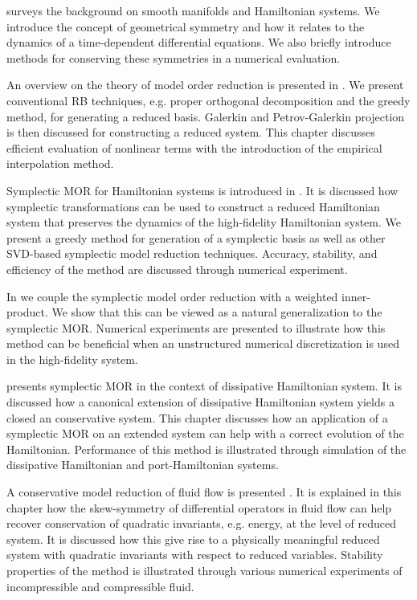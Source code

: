  surveys the background on smooth manifolds and Hamiltonian systems. We introduce the concept of geometrical symmetry and how it relates to the dynamics of a time-dependent differential equations. We also briefly introduce methods for conserving these symmetries in a numerical evaluation.

An overview on the theory of model order reduction is presented in . We present conventional RB techniques, e.g. proper orthogonal decomposition and the greedy method, for generating a reduced basis. Galerkin and Petrov-Galerkin projection is then discussed for constructing a reduced system. This chapter discusses efficient evaluation of nonlinear terms with the introduction of the empirical interpolation method.

Symplectic MOR for Hamiltonian systems is introduced in . It is discussed how symplectic transformations can be used to construct a reduced Hamiltonian system that preserves the dynamics of the high-fidelity Hamiltonian system. We present a greedy method for generation of a symplectic basis as well as other SVD-based symplectic model reduction techniques. Accuracy, stability, and efficiency of the method are discussed through numerical experiment.

In  we couple the symplectic model order reduction with a weighted inner-product. We show that this can be viewed as a natural generalization to the symplectic MOR. Numerical experiments are presented to illustrate how this method can be beneficial when an unstructured numerical discretization is used in the high-fidelity system.

 presents symplectic MOR in the context of dissipative Hamiltonian system. It is discussed how a canonical extension of dissipative Hamiltonian system yields a closed an conservative system. This chapter discusses how an application of a symplectic MOR on an extended system can help with a correct evolution of the Hamiltonian. Performance of this method is illustrated through simulation of the dissipative Hamiltonian and port-Hamiltonian systems.

A conservative model reduction of fluid flow is presented . It is explained in this chapter how the skew-symmetry of differential operators in fluid flow can help recover conservation of quadratic invariants, e.g. energy, at the level of reduced system. It is discussed how this give rise to a physically meaningful reduced system with quadratic invariants with respect to reduced variables. Stability properties of the method is illustrated through various numerical experiments of incompressible and compressible fluid.
